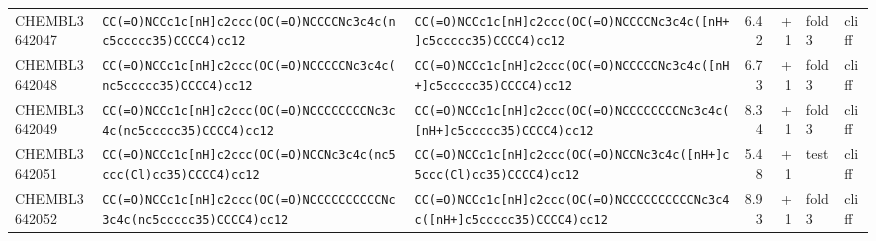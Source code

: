 \begin{longtable}{l p{4.4cm} p{4.4cm} r r l l}
CHEMBL3642047 & \texttt{CC(\allowbreak{}=\allowbreak{}O)\allowbreak{}NCCc1c[nH]\allowbreak{}c2ccc(\allowbreak{}OC(\allowbreak{}=\allowbreak{}O)\allowbreak{}NCCCCNc3c4c(\allowbreak{}nc5ccccc35)\allowbreak{}CCCC4)\allowbreak{}cc12} & \texttt{CC(\allowbreak{}=\allowbreak{}O)\allowbreak{}NCCc1c[nH]\allowbreak{}c2ccc(\allowbreak{}OC(\allowbreak{}=\allowbreak{}O)\allowbreak{}NCCCCNc3c4c(\allowbreak{}[nH+]\allowbreak{}c5ccccc35)\allowbreak{}CCCC4)\allowbreak{}cc12} & 6.42 & +1 & fold 3 & cliff \\
CHEMBL3642048 & \texttt{CC(\allowbreak{}=\allowbreak{}O)\allowbreak{}NCCc1c[nH]\allowbreak{}c2ccc(\allowbreak{}OC(\allowbreak{}=\allowbreak{}O)\allowbreak{}NCCCCCNc3c4c(\allowbreak{}nc5ccccc35)\allowbreak{}CCCC4)\allowbreak{}cc12} & \texttt{CC(\allowbreak{}=\allowbreak{}O)\allowbreak{}NCCc1c[nH]\allowbreak{}c2ccc(\allowbreak{}OC(\allowbreak{}=\allowbreak{}O)\allowbreak{}NCCCCCNc3c4c(\allowbreak{}[nH+]\allowbreak{}c5ccccc35)\allowbreak{}CCCC4)\allowbreak{}cc12} & 6.73 & +1 & fold 3 & cliff \\
CHEMBL3642049 & \texttt{CC(\allowbreak{}=\allowbreak{}O)\allowbreak{}NCCc1c[nH]\allowbreak{}c2ccc(\allowbreak{}OC(\allowbreak{}=\allowbreak{}O)\allowbreak{}NCCCCCCCCNc3c4c(\allowbreak{}nc5ccccc35)\allowbreak{}CCCC4)\allowbreak{}cc12} & \texttt{CC(\allowbreak{}=\allowbreak{}O)\allowbreak{}NCCc1c[nH]\allowbreak{}c2ccc(\allowbreak{}OC(\allowbreak{}=\allowbreak{}O)\allowbreak{}NCCCCCCCCNc3c4c(\allowbreak{}[nH+]\allowbreak{}c5ccccc35)\allowbreak{}CCCC4)\allowbreak{}cc12} & 8.34 & +1 & fold 3 & cliff \\
CHEMBL3642051 & \texttt{CC(\allowbreak{}=\allowbreak{}O)\allowbreak{}NCCc1c[nH]\allowbreak{}c2ccc(\allowbreak{}OC(\allowbreak{}=\allowbreak{}O)\allowbreak{}NCCNc3c4c(\allowbreak{}nc5ccc(\allowbreak{}Cl)\allowbreak{}cc35)\allowbreak{}CCCC4)\allowbreak{}cc12} & \texttt{CC(\allowbreak{}=\allowbreak{}O)\allowbreak{}NCCc1c[nH]\allowbreak{}c2ccc(\allowbreak{}OC(\allowbreak{}=\allowbreak{}O)\allowbreak{}NCCNc3c4c(\allowbreak{}[nH+]\allowbreak{}c5ccc(\allowbreak{}Cl)\allowbreak{}cc35)\allowbreak{}CCCC4)\allowbreak{}cc12} & 5.48 & +1 & test & cliff \\
CHEMBL3642052 & \texttt{CC(\allowbreak{}=\allowbreak{}O)\allowbreak{}NCCc1c[nH]\allowbreak{}c2ccc(\allowbreak{}OC(\allowbreak{}=\allowbreak{}O)\allowbreak{}NCCCCCCCCCCNc3c4c(\allowbreak{}nc5ccccc35)\allowbreak{}CCCC4)\allowbreak{}cc12} & \texttt{CC(\allowbreak{}=\allowbreak{}O)\allowbreak{}NCCc1c[nH]\allowbreak{}c2ccc(\allowbreak{}OC(\allowbreak{}=\allowbreak{}O)\allowbreak{}NCCCCCCCCCCNc3c4c(\allowbreak{}[nH+]\allowbreak{}c5ccccc35)\allowbreak{}CCCC4)\allowbreak{}cc12} & 8.93 & +1 & fold 3 & cliff \\

\end{longtable}
